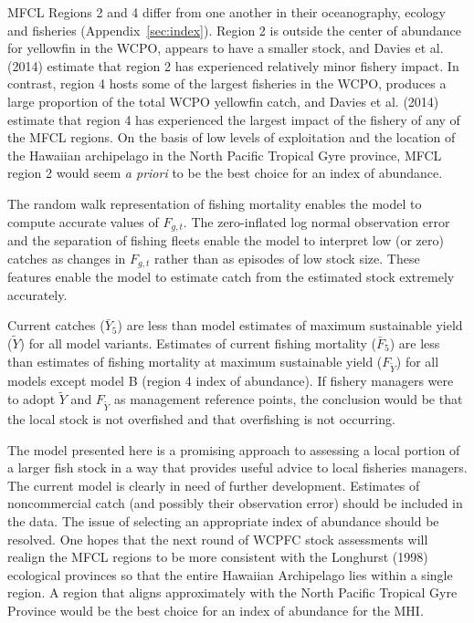 \documentclass[12pt,letterpaper]{article}
\newcommand\MSY{\widetilde{Y}}
\newcommand\Fmsy{F_{\MSY}}
\begin{document}
MFCL Regions 2 and 4 differ from one another in their oceanography,
ecology and fisheries (Appendix~\ref{sec:index}). 
Region 2 is outside the center of abundance for yellowfin in the
WCPO, appears to have a smaller stock, and Davies et al. (2014)
estimate that region 2 has experienced relatively minor fishery impact.
In contrast, region 4 hosts some of the largest fisheries in the WCPO,
produces a large proportion of the total WCPO yellowfin catch, and
Davies et al. (2014) estimate that region 4 has experienced
the largest impact of the fishery of any of the MFCL regions.
On the basis of low levels of exploitation and the location of the
Hawaiian archipelago in the North Pacific Tropical Gyre province, MFCL
region 2 would seem {\it a priori} to be the best choice for
an index of abundance.

The random walk representation of fishing mortality enables
the model to compute accurate values of $F_{g,t}$. The zero-inflated
log normal observation error and the separation of fishing fleets
enable the model to interpret low (or zero) catches as changes in
$F_{g,t}$ rather than as episodes of low stock size.
These features enable the model to estimate catch
from the estimated stock extremely accurately.

Current catches ($\bar{Y}_5$) are less than model estimates of maximum
sustainable yield ($\MSY$) for all model variants. 
Estimates of current fishing mortality ($\bar{F}_5$) are less than
estimates of fishing mortality at maximum sustainable yield ($\Fmsy$)
for all models except model B (region 4 index of abundance).
If fishery managers were to adopt $\MSY$ and $\Fmsy$ as management
reference points, the conclusion would be that the local stock is not
overfished and that overfishing is not occurring.

The model presented here is a promising approach to assessing a local
portion of a larger fish stock in a way that provides useful advice to
local fisheries managers. The current model is clearly in need of
further development. Estimates of noncommercial catch (and possibly
their observation error) should be included in the data. 
The issue of selecting an appropriate index of abundance should be
resolved. One hopes that the
next round of  WCPFC stock assessments will realign
the MFCL regions to be more consistent
with the Longhurst (1998) ecological provinces so that the entire
Hawaiian Archipelago lies within a single region. 
A region that aligns approximately with  the North Pacific Tropical
Gyre Province would be the best choice for an index of abundance for
the MHI.
\end{document}

